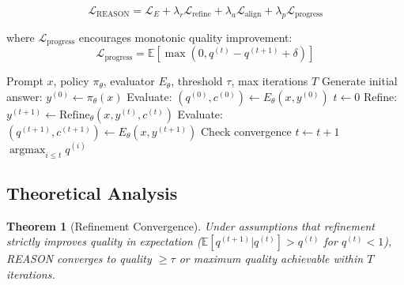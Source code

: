 \documentclass[11pt,a4paper]{article}
\newtheorem{theorem}{Theorem}[section]
\newcommand{\E}{\mathbb{E}}
\newcommand{\argmax}{\operatorname{argmax}}
\begin{document}
\begin{equation}
    \mathcal{L}_{\text{REASON}} = \mathcal{L}_E + \lambda_r \mathcal{L}_{\text{refine}} + \lambda_a \mathcal{L}_{\text{align}} + \lambda_p \mathcal{L}_{\text{progress}}
\end{equation}

where $\mathcal{L}_{\text{progress}}$ encourages monotonic quality improvement:
\begin{equation}
    \mathcal{L}_{\text{progress}} = \E\left[\max(0, q^{(t)} - q^{(t+1)} + \delta)\right]
\end{equation}

\begin{algorithm}[t]
\caption{REASON Inference}
\label{alg:reason}
\begin{algorithmic}[1]
\REQUIRE Prompt $x$, policy $\pi_\theta$, evaluator $E_\theta$, threshold $\tau$, max iterations $T$
\STATE Generate initial answer: $y^{(0)} \leftarrow \pi_\theta(x)$
\STATE Evaluate: $(q^{(0)}, c^{(0)}) \leftarrow E_\theta(x, y^{(0)})$
\STATE $t \leftarrow 0$
    \STATE Refine: $y^{(t+1)} \leftarrow \text{Refine}_\theta(x, y^{(t)}, c^{(t)})$
    \STATE Evaluate: $(q^{(t+1)}, c^{(t+1)}) \leftarrow E_\theta(x, y^{(t+1)})$
    \STATE Check convergence
    \STATE $t \leftarrow t + 1$
\ENDWHILE
\RETURN $\argmax_{i \leq t} q^{(i)}$
\end{algorithmic}
\end{algorithm}

\subsection{Theoretical Analysis}

\begin{theorem}[Refinement Convergence]
Under assumptions that refinement strictly improves quality in expectation ($\E[q^{(t+1)}|q^{(t)}] > q^{(t)}$ for $q^{(t)} < 1$), REASON converges to quality $\geq \tau$ or maximum quality achievable within $T$ iterations.
\end{theorem}
\end{document}
